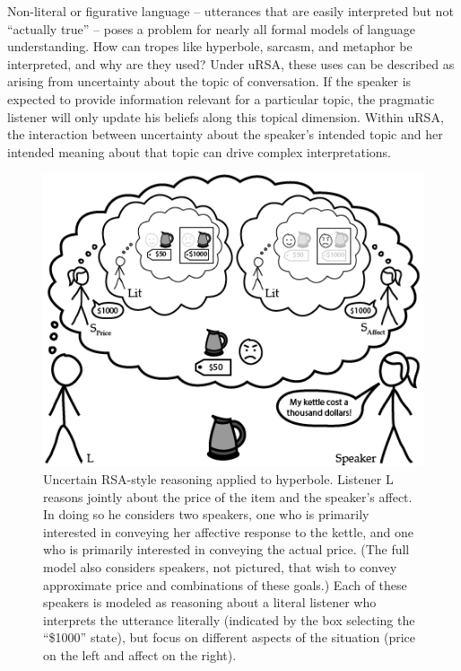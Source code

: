 \documentclass[]{elsarticle}
\begin{document}
Non-literal or figurative language -- utterances that are easily interpreted but not
``actually true'' -- poses a problem for nearly all formal models of language
understanding. How can tropes like
hyperbole, sarcasm, and metaphor be interpreted, and why are they used?
Under uRSA, these uses can be described as arising from uncertainty
about the topic of conversation. If the speaker is expected to provide
information relevant for a particular topic,
the pragmatic listener will only update his beliefs along this topical
dimension. Within uRSA, the interaction between uncertainty about the speaker's
intended topic and her intended meaning about that topic can drive
complex interpretations.

\begin{figure}[ht]
\begin{center}
\includegraphics[width=1.0\textwidth]{images/media/image03.png}
\caption{\label{fig:ursa} Uncertain RSA-style reasoning applied to hyperbole. Listener L reasons jointly about the price of the item and the speaker's affect. In doing so he considers two speakers, one who is primarily interested in conveying her affective response to the kettle, and one who is primarily interested in conveying the actual price. (The full model also considers speakers, not pictured, that wish to convey approximate price and combinations of these goals.) Each of these speakers is modeled as reasoning about a literal listener who interprets the utterance literally (indicated by the box selecting the ``\$1000'' state), but focus on different aspects of the situation (price on the left and affect on the right).}
\end{center}
\end{figure}
\end{document}
